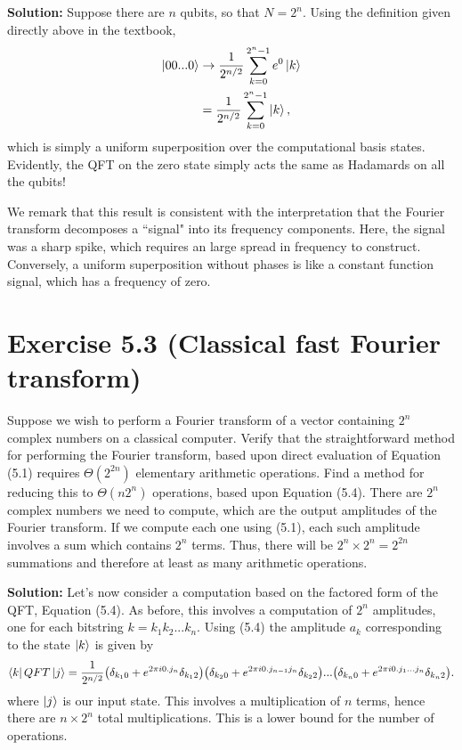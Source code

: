 \documentclass{book}
\begin{document}
    \textbf{Solution:} Suppose there are $n$ qubits, so that $N=2^n$. Using the definition given directly above in the textbook,
    \begin{align}
        \ket{00...0} &\rightarrow \frac{1}{2^{n/2}} \sum_{k=0}^{2^n-1}e^0 \ket{k} \\
        &= \frac{1}{2^{n/2}}\sum_{k=0}^{2^n-1}\ket{k},
    \end{align}
    which is simply a uniform superposition over the computational basis states. Evidently, the QFT on the zero state simply acts the same as Hadamards on all the qubits!
    
    We remark that this result is consistent with the interpretation that the Fourier transform decomposes a ``signal" into its frequency components. Here, the signal was a sharp spike, which requires an large spread in frequency to construct. Conversely, a uniform superposition without phases is like a constant function signal, which has a frequency of zero. 

\section*{Exercise 5.3 (Classical fast Fourier transform)} 
    Suppose we wish to perform a Fourier transform of a vector containing $2^n$ complex numbers on a classical computer. Verify that the straightforward method for performing the Fourier transform, based upon direct evaluation of Equation (5.1) requires $\Theta(2^{2n})$ elementary arithmetic operations. Find a method for reducing this to $\Theta(n2^n)$ operations, based upon Equation (5.4).
    There are $2^n$ complex numbers we need to compute, which are the output amplitudes of the Fourier transform. If we compute each one using (5.1), each such amplitude involves a sum which contains $2^n$ terms. Thus, there will be $2^n \times 2^n = 2^{2n}$ summations and therefore at least as many arithmetic operations.
    
    \textbf{Solution:} Let's now consider a computation based on the factored form of the QFT, Equation (5.4). As before, this involves a computation of $2^n$ amplitudes, one for each bitstring $k = k_1k_2...k_n$. Using (5.4) the amplitude $a_{k}$ corresponding to the state $\ket{k}$ is given by
    \begin{align}
        \bra{k}QFT\ket{j} = \frac{1}{2^{n/2}}\big(\delta_{k_1 0}+e^{2\pi i0.j_n}\delta_{k_1 2}\big)\big(\delta_{k_2 0}+e^{2\pi i0.j_{n-1}j_n}\delta_{k_2 2}\big)...\big(\delta_{k_n 0}+e^{2\pi i0.j_1...j_n}\delta_{k_n 2}\big).
    \end{align}
    where $\ket{j}$ is our input state. This involves a multiplication of $n$ terms, hence there are $n\times 2^n$ total multiplications. This is a lower bound for the number of operations. 
\end{document}
